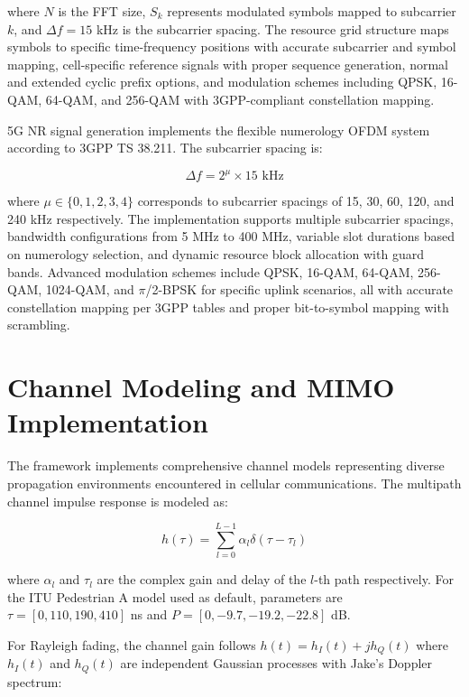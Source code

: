\documentclass[twocolumn,10pt]{article}
\begin{document}
where $N$ is the FFT size, $S_k$ represents modulated symbols mapped to subcarrier $k$, and $\Delta f = 15$ kHz is the subcarrier spacing. The resource grid structure maps symbols to specific time-frequency positions with accurate subcarrier and symbol mapping, cell-specific reference signals with proper sequence generation, normal and extended cyclic prefix options, and modulation schemes including QPSK, 16-QAM, 64-QAM, and 256-QAM with 3GPP-compliant constellation mapping.

5G NR signal generation implements the flexible numerology OFDM system according to 3GPP TS 38.211. The subcarrier spacing is:

\begin{equation}
\Delta f = 2^\mu \times 15 \text{ kHz}
\end{equation}

where $\mu \in \{0, 1, 2, 3, 4\}$ corresponds to subcarrier spacings of 15, 30, 60, 120, and 240 kHz respectively. The implementation supports multiple subcarrier spacings, bandwidth configurations from 5 MHz to 400 MHz, variable slot durations based on numerology selection, and dynamic resource block allocation with guard bands. Advanced modulation schemes include QPSK, 16-QAM, 64-QAM, 256-QAM, 1024-QAM, and $\pi$/2-BPSK for specific uplink scenarios, all with accurate constellation mapping per 3GPP tables and proper bit-to-symbol mapping with scrambling.

\section{Channel Modeling and MIMO Implementation}

The framework implements comprehensive channel models representing diverse propagation environments encountered in cellular communications. The multipath channel impulse response is modeled as:

\begin{equation}
h(\tau) = \sum_{l=0}^{L-1} \alpha_l \delta(\tau - \tau_l)
\end{equation}

where $\alpha_l$ and $\tau_l$ are the complex gain and delay of the $l$-th path respectively. For the ITU Pedestrian A model used as default, parameters are $\tau = [0, 110, 190, 410]$ ns and $P = [0, -9.7, -19.2, -22.8]$ dB.

For Rayleigh fading, the channel gain follows $h(t) = h_I(t) + jh_Q(t)$ where $h_I(t)$ and $h_Q(t)$ are independent Gaussian processes with Jake's Doppler spectrum:
\end{document}
